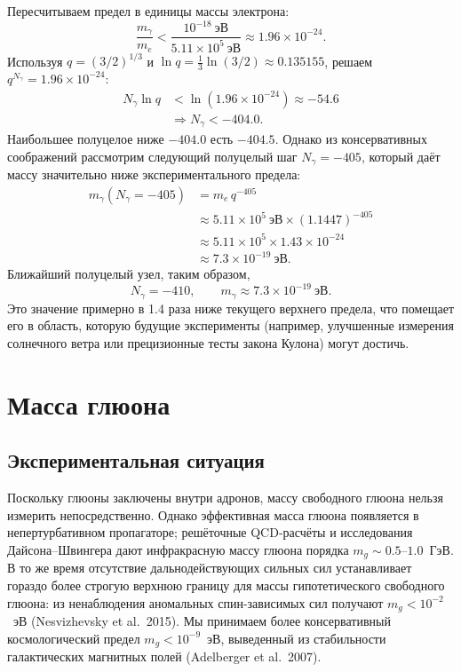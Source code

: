 \documentclass[11pt,a4paper]{article}
\begin{document}
	Пересчитываем предел в единицы массы электрона:
	\[
	\frac{m_\gamma}{m_e} < \frac{10^{-18}~\mathrm{эВ}}{5.11\times 10^5~\mathrm{эВ}}
	\approx 1.96 \times 10^{-24}.
	\]
	Используя $q = (3/2)^{1/3}$ и $\ln q = \tfrac13\ln(3/2) \approx 0.135155$, решаем $q^{N_\gamma} = 1.96\times10^{-24}$:
	\[
	\begin{aligned}
		N_\gamma \ln q &< \ln(1.96\times10^{-24}) \approx -54.6 \\
		&\Longrightarrow N_\gamma < -404.0 .
	\end{aligned}
	\]
	Наибольшее полуцелое ниже $-404.0$ есть $-404.5$. Однако из консервативных соображений рассмотрим следующий
	полуцелый шаг $N_\gamma = -405$, который даёт массу значительно ниже экспериментального предела:
	\[
	\begin{aligned}
		m_\gamma(N_\gamma = -405) &= m_e \, q^{-405} \\
		&\approx 5.11\times10^5~\mathrm{эВ} \times (1.1447)^{-405} \\
		&\approx 5.11\times10^5 \times 1.43\times10^{-24} \\
		&\approx 7.3 \times 10^{-19}~\mathrm{эВ}.
	\end{aligned}
	\]
	Ближайший полуцелый узел, таким образом,
	\[
	\boxed{N_\gamma = -410}, \qquad
	\boxed{m_\gamma \approx 7.3 \times 10^{-19}~\mathrm{эВ}} .
	\]
	Это значение примерно в 1.4 раза ниже текущего верхнего предела, что помещает его в область, которую будущие
	эксперименты (например, улучшенные измерения солнечного ветра или прецизионные тесты закона Кулона) могут достичь.
	
	\section{Масса глюона}
	
	\subsection{Экспериментальная ситуация}
	
	Поскольку глюоны заключены внутри адронов, массу свободного глюона нельзя измерить непосредственно.
	Однако эффективная масса глюона появляется в непертурбативном пропагаторе; решёточные QCD-расчёты и
	исследования Дайсона–Швингера дают инфракрасную массу глюона порядка $m_g \sim 0.5$–$1.0$~ГэВ.
	В то же время отсутствие дальнодействующих сильных сил устанавливает гораздо более строгую верхнюю границу
	для массы гипотетического свободного глюона: из ненаблюдения аномальных спин-зависимых сил получают
	$m_g < 10^{-2}$~эВ (Nesvizhevsky et al.\ 2015). Мы принимаем более консервативный космологический предел
	$m_g < 10^{-9}$~эВ, выведенный из стабильности галактических магнитных полей (Adelberger et al.\ 2007).
	
\end{document}
